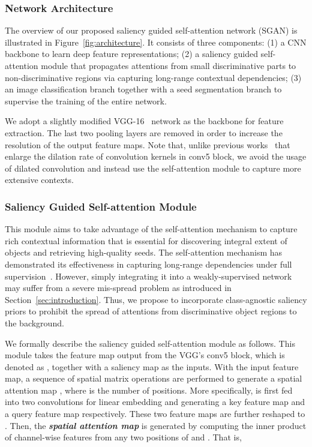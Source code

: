 \documentclass[journal]{IEEEtran}
\begin{document}
\subsubsection{Network Architecture} 
The overview of our proposed saliency guided self-attention network (SGAN) is illustrated in Figure~\ref{fig:architecture}. It consists of three components: (1) a CNN backbone to learn deep feature representations; (2) a saliency guided self-attention module that propagates attentions from small discriminative parts to non-discriminative regions via capturing long-range contextual dependencies; (3) an image classification branch together with a seed segmentation branch to supervise the training of the entire network. 

We adopt a slightly modified VGG-16~\cite{kolesnikov2016seed} network as the backbone for feature extraction. The last two pooling layers are removed in order to increase the resolution of the output feature maps. Note that, unlike previous works~\cite{wei2018revisiting,fan2018cian,lee2019ficklenet} that enlarge the dilation rate of convolution kernels in conv5 block, we avoid the usage of dilated convolution and instead use the self-attention module to capture more extensive contexts.

\subsubsection{Saliency Guided Self-attention Module}
\label{SGAN} 
This module aims to take advantage of the self-attention mechanism to capture rich contextual information that is essential for discovering integral extent of objects and retrieving high-quality seeds. The self-attention mechanism has demonstrated its effectiveness in capturing long-range dependencies under full supervision~\cite{fu2019dual,yuan2018ocnet}. However, simply integrating it into a weakly-supervised network may suffer from a severe mis-spread problem as introduced in Section~\ref{sec:introduction}. Thus, we propose to incorporate class-agnostic saliency priors to prohibit the spread of attentions from discriminative object regions to the background. 

We formally describe the saliency guided self-attention module as follows. This module takes the feature map output from the VGG's conv5 block, which is denoted as , together with a saliency map as the inputs. With the input feature map, a sequence of spatial matrix operations are performed to generate a spatial attention map , where  is the number of positions. More specifically,  is first fed into two  convolutions for linear embedding and generating a key feature map  and a query feature map  respectively. These two feature maps are further reshaped to . Then, the \textit{\textbf{spatial attention map}}  is generated by computing the inner product of channel-wise features from any two positions of  and . That is, 
\end{document}
